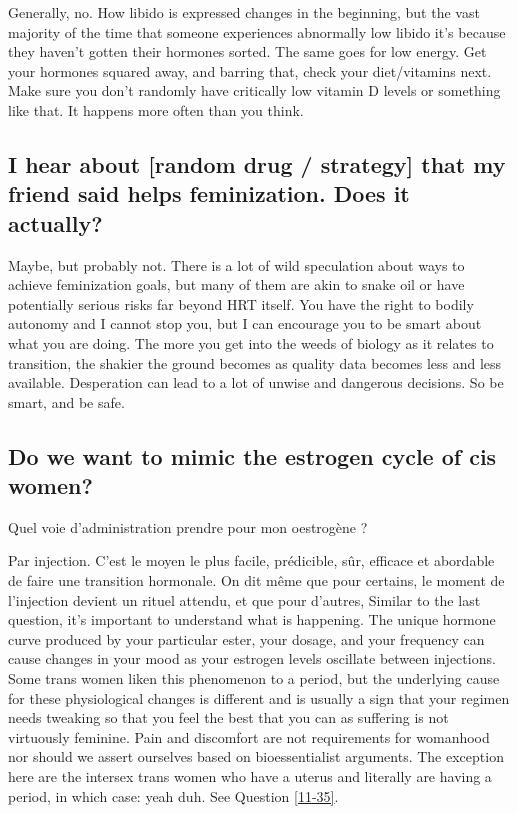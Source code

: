 \documentclass{article}
\begin{document}
Generally, no. How libido is expressed changes in the beginning, but the vast majority of the time that someone experiences abnormally low libido it’s because they haven’t gotten their hormones sorted. The same goes for low energy. Get your hormones squared away, and barring that, check your diet/vitamins next. Make sure you don’t randomly have critically low vitamin D levels or something like that. It happens more often than you think.

\subsection{I hear about [random drug / strategy] that my friend said helps feminization. Does it actually?}

Maybe, but probably not. There is a lot of wild speculation about ways to achieve feminization goals, but many of them are akin to snake oil or have potentially serious risks far beyond HRT itself. You have the right to bodily autonomy and I cannot stop you, but I can encourage you to be smart about what you are doing. The more you get into the weeds of biology as it relates to transition, the shakier the ground becomes as quality data becomes less and less available. Desperation can lead to a lot of unwise and dangerous decisions. So be smart, and be safe. 

\subsection{Do we want to mimic the estrogen cycle of cis women?}\label{11-10}

Quel voie d'administration prendre pour mon oestrogène ?

Par injection. C'est le moyen le plus facile, prédicible, sûr, efficace et abordable de faire une transition hormonale. On dit même que pour certains, le moment de l'injection devient un rituel attendu, et que pour d'autres,  
Similar to the last question, it’s important to understand what is happening. The unique hormone curve produced by your particular ester, your dosage, and your frequency can cause changes in your mood as your estrogen levels oscillate between injections. Some trans women liken this phenomenon to a period, but the underlying cause for these physiological changes is different and is usually a sign that your regimen needs tweaking so that you feel the best that you can as suffering is not virtuously feminine. Pain and discomfort are not requirements for womanhood nor should we assert ourselves based on bioessentialist arguments. The exception here are the intersex trans women who have a uterus and literally are having a period, in which case: yeah duh. See Question \ref{11-35}.
\end{document}

